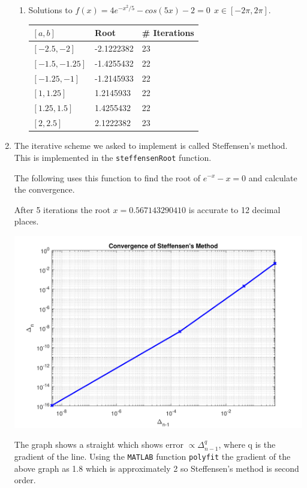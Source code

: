 \documentclass[a4paper,11pt]{article}
\begin{document}
\begin{enumerate}
\begin{enumerate}
		
		\item Solutions to $f(x) = 4e^{-x^{2}/5} - cos(5x) - 2 = 0 \  \ 
		x\in[-2\pi,2\pi]$.
		
		\begin{center}
			\begin{tabular}{l|ll}
				$[a,b]$        & Root       & \# Iterations \\ \hline
				$[-2.5,-2]$    & -2.1222382 & 23            \\
				$[-1.5,-1.25]$ & -1.4255432 & 22            \\
				$[-1.25,-1]$   & -1.2145933 & 22            \\
				$[1,1.25]$     & 1.2145933  & 22            \\
				$[1.25,1.5]$   & 1.4255432  & 22            \\
				$[2,2.5]$      & 2.1222382  & 23           
			\end{tabular}
		\end{center}
	\end{enumerate}


	\item The iterative scheme we asked to implement is called Steffensen's 
	method. This is implemented in the \verb*|steffensenRoot| function.
	
	The following uses this function to find the root of $e^{-x} - x = 0$ and 
	calculate the convergence.
	
	After 5 iterations the root $x = 0.567143290410$ is accurate to 12 
	decimal places.
	\begin{center}
		\includegraphics[scale=0.6]{images/Q1c.pdf}
	\end{center}
	The graph shows a straight which shows error $\propto \Delta_{n-1}^{q}$, 
	where q is the gradient of the line. Using the \verb*|MATLAB| function 
	\verb*|polyfit| the gradient of the 
	above graph as 1.8 which is approximately 2 so Steffensen's method is 
	second 
	order.
	

\end{enumerate}
\end{document}
